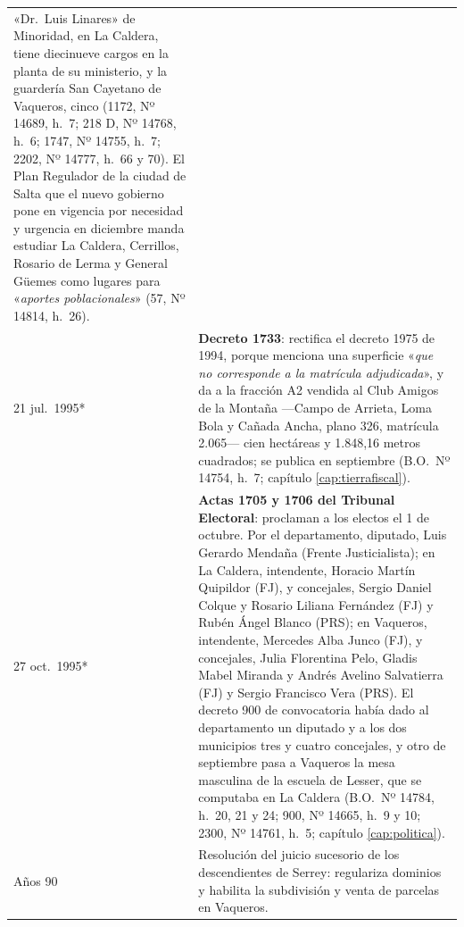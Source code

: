 \begin{longtable}{@{}p{2.7cm}p{10.3cm}@{}}
«Dr.\ Luis Linares» de Minoridad, en La Caldera, tiene diecinueve cargos en la planta de su ministerio, y la guardería San Cayetano de Vaqueros, cinco (1172, Nº 14689, h.\ 7; 218 D, Nº 14768, h.\ 6; 1747, Nº 14755, h.\ 7; 2202, Nº 14777, h.\ 66 y 70). El Plan Regulador de la ciudad de Salta que el nuevo gobierno pone en vigencia por necesidad y urgencia en diciembre manda estudiar La Caldera, Cerrillos, Rosario de Lerma y General Güemes como lugares para «\textit{aportes poblacionales}» (57, Nº 14814, h.\ 26). \\
21 jul.\ 1995* & \textbf{Decreto 1733}: rectifica el decreto 1975 de 1994, porque menciona una superficie «\textit{que no corresponde a la matrícula adjudicada}», y da a la fracción A2 vendida al Club Amigos de la Montaña ---Campo de Arrieta, Loma Bola y Cañada Ancha, plano 326, matrícula 2.065--- cien hectáreas y 1.848,16 metros cuadrados; se publica en septiembre (B.O.\ Nº 14754, h.\ 7; capítulo \ref{cap:tierrafiscal}). \\
27 oct.\ 1995* & \textbf{Actas 1705 y 1706 del Tribunal Electoral}: proclaman a los electos el 1 de octubre. Por el departamento, diputado, Luis Gerardo Mendaña (Frente Justicialista); en La Caldera, intendente, Horacio Martín Quipildor (FJ), y concejales, Sergio Daniel Colque y Rosario Liliana Fernández (FJ) y Rubén Ángel Blanco (PRS); en Vaqueros, intendente, Mercedes Alba Junco (FJ), y concejales, Julia Florentina Pelo, Gladis Mabel Miranda y Andrés Avelino Salvatierra (FJ) y Sergio Francisco Vera (PRS). El decreto 900 de convocatoria había dado al departamento un diputado y a los dos municipios tres y cuatro concejales, y otro de septiembre pasa a Vaqueros la mesa masculina de la escuela de Lesser, que se computaba en La Caldera (B.O.\ Nº 14784, h.\ 20, 21 y 24; 900, Nº 14665, h.\ 9 y 10; 2300, Nº 14761, h.\ 5; capítulo \ref{cap:politica}). \\
Años 90 & Resolución del juicio sucesorio de los descendientes de Serrey\index{Serrey, Carlos}: regulariza dominios y habilita la subdivisión y venta de parcelas en Vaqueros. \\

\end{longtable}

